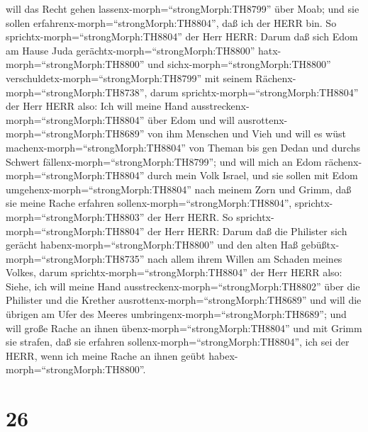 will das Recht gehen lassenx-morph=``strongMorph:TH8799'' über Moab; und
sie sollen erfahrenx-morph=``strongMorph:TH8804'', daß ich der HERR bin.
 So sprichtx-morph=``strongMorph:TH8804'' der Herr HERR:
Darum daß sich Edom am Hause Juda gerächtx-morph=``strongMorph:TH8800''
hatx-morph=``strongMorph:TH8800'' und sichx-morph=``strongMorph:TH8800''
verschuldetx-morph=``strongMorph:TH8799'' mit seinem
Rächenx-morph=``strongMorph:TH8738'',  darum
sprichtx-morph=``strongMorph:TH8804'' der Herr HERR also: Ich will meine
Hand ausstreckenx-morph=``strongMorph:TH8804'' über Edom und will
ausrottenx-morph=``strongMorph:TH8689'' von ihm Menschen und Vieh und
will es wüst machenx-morph=``strongMorph:TH8804'' von Theman bis gen
Dedan und durchs Schwert fällenx-morph=``strongMorph:TH8799'';
 und will mich an Edom rächenx-morph=``strongMorph:TH8804''
durch mein Volk Israel, und sie sollen mit Edom
umgehenx-morph=``strongMorph:TH8804'' nach meinem Zorn und Grimm, daß
sie meine Rache erfahren sollenx-morph=``strongMorph:TH8804'',
sprichtx-morph=``strongMorph:TH8803'' der Herr HERR.  So
sprichtx-morph=``strongMorph:TH8804'' der Herr HERR: Darum daß die
Philister sich gerächt habenx-morph=``strongMorph:TH8800'' und den alten
Haß gebüßtx-morph=``strongMorph:TH8735'' nach allem ihrem Willen am
Schaden meines Volkes,  darum
sprichtx-morph=``strongMorph:TH8804'' der Herr HERR also: Siehe, ich
will meine Hand ausstreckenx-morph=``strongMorph:TH8802'' über die
Philister und die Krether ausrottenx-morph=``strongMorph:TH8689'' und
will die übrigen am Ufer des Meeres
umbringenx-morph=``strongMorph:TH8689'';  und will große
Rache an ihnen übenx-morph=``strongMorph:TH8804'' und mit Grimm sie
strafen, daß sie erfahren sollenx-morph=``strongMorph:TH8804'', ich sei
der HERR, wenn ich meine Rache an ihnen geübt
habex-morph=``strongMorph:TH8800''.

\hypertarget{section-25}{%
\section{26}\label{section-25}}

